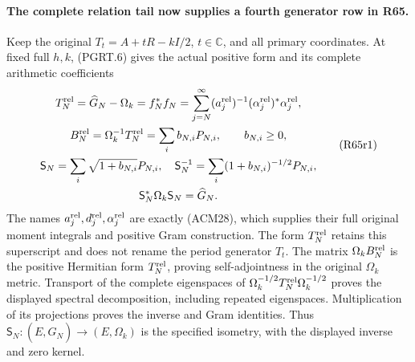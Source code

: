 \paragraph{The complete relation tail now supplies a fourth generator row in R65.}
Keep the original $T_t=A+tR-kI/2$, $t\in\mathbb C$, and all
primary coordinates. At fixed full $h,k$, (PGRT.6) gives the
actual positive form and its complete arithmetic coefficients
\[
\begin{gathered}
 T_N^{\rm rel}=\widehat G_N-\Omega_k=f_N^*f_N
   =\sum_{j=N}^{\infty}(a_j^{\rm rel})^{-1}
          (\alpha_j^{\rm rel})^*\alpha_j^{\rm rel},\\
 B_N^{\rm rel}=\Omega_k^{-1}T_N^{\rm rel}
       =\sum_i b_{N,i}P_{N,i},\qquad b_{N,i}\geq0,\\
 \mathsf S_N=\sum_i\sqrt{1+b_{N,i}}P_{N,i},\quad
 \mathsf S_N^{-1}=\sum_i(1+b_{N,i})^{-1/2}P_{N,i},\\
 \mathsf S_N^*\Omega_k\mathsf S_N=\widehat G_N.
\end{gathered}\tag{R65r1}
\]
The names $a_j^{\rm rel},d_j^{\rm rel},\alpha_j^{\rm rel}$
are exactly (ACM28), which supplies their full original moment
integrals and positive Gram construction. The form
$T_N^{\rm rel}$ retains this superscript and does not rename
the period generator $T_t$. The matrix $\Omega_k B_N^{\rm rel}$
is the positive Hermitian form $T_N^{\rm rel}$, proving
self-adjointness in the original $\Omega_k$ metric. Transport
of the complete eigenspaces of
$\Omega_k^{-1/2}T_N^{\rm rel}\Omega_k^{-1/2}$ proves the
displayed spectral decomposition, including repeated eigenspaces.
Multiplication of its projections proves the inverse and Gram
identities. Thus $\mathsf S_N:(E,\widehat G_N)\to(E,\Omega_k)$
is the specified isometry, with the displayed inverse and zero
kernel.

